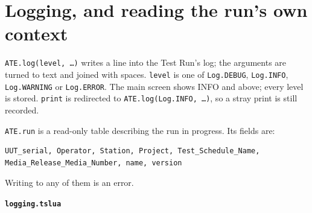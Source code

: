 \section{Logging, and reading the run's own context}

\texttt{ATE.log(level, \dots)} writes a line into the Test Run's log; the arguments are turned
to text and joined with spaces. \texttt{level} is one of \texttt{Log.DEBUG},
\texttt{Log.INFO}, \texttt{Log.WARNING} or \texttt{Log.ERROR}. The main screen shows INFO and
above; every level is stored. \texttt{print} is redirected to \texttt{ATE.log(Log.INFO, \dots)},
so a stray print is still recorded.

\texttt{ATE.run} is a read-only table describing the run in progress. Its fields are:

\begingroup\footnotesize
\begin{verbatim}
UUT_serial, Operator, Station, Project, Test_Schedule_Name,
Media_Release_Media_Number, name, version
\end{verbatim}
\endgroup

Writing to any of them is an error.

\noindent\textbf{\texttt{logging.tslua}}\par


